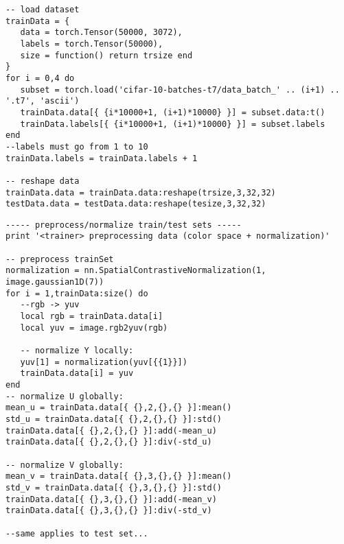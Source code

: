 \begin{lstlisting}[language={[5.2]Lua}]
-- load dataset
trainData = {
   data = torch.Tensor(50000, 3072),
   labels = torch.Tensor(50000),
   size = function() return trsize end
}
for i = 0,4 do
   subset = torch.load('cifar-10-batches-t7/data_batch_' .. (i+1) .. '.t7', 'ascii')
   trainData.data[{ {i*10000+1, (i+1)*10000} }] = subset.data:t()
   trainData.labels[{ {i*10000+1, (i+1)*10000} }] = subset.labels
end
--labels must go from 1 to 10 
trainData.labels = trainData.labels + 1

-- reshape data
trainData.data = trainData.data:reshape(trsize,3,32,32)
testData.data = testData.data:reshape(tesize,3,32,32)

\end{lstlisting}

\begin{lstlisting}[language={[5.2]Lua}]
----- preprocess/normalize train/test sets -----
print '<trainer> preprocessing data (color space + normalization)'

-- preprocess trainSet
normalization = nn.SpatialContrastiveNormalization(1, image.gaussian1D(7))
for i = 1,trainData:size() do
   --rgb -> yuv
   local rgb = trainData.data[i]
   local yuv = image.rgb2yuv(rgb)
   
   -- normalize Y locally:
   yuv[1] = normalization(yuv[{{1}}])
   trainData.data[i] = yuv
end
-- normalize U globally:
mean_u = trainData.data[{ {},2,{},{} }]:mean()
std_u = trainData.data[{ {},2,{},{} }]:std()
trainData.data[{ {},2,{},{} }]:add(-mean_u)
trainData.data[{ {},2,{},{} }]:div(-std_u)

-- normalize V globally:
mean_v = trainData.data[{ {},3,{},{} }]:mean()
std_v = trainData.data[{ {},3,{},{} }]:std()
trainData.data[{ {},3,{},{} }]:add(-mean_v)
trainData.data[{ {},3,{},{} }]:div(-std_v)

--same applies to test set...
\end{lstlisting}

